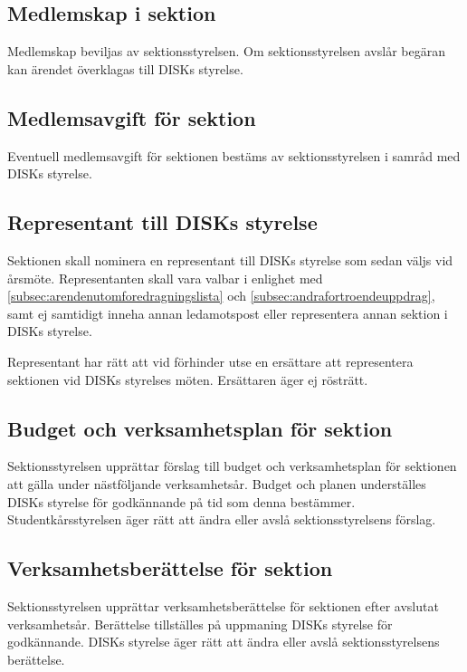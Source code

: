         \subsection{Medlemskap i sektion}
        \label{subsec:medlemskapisektion}
                Medlemskap beviljas av sektionsstyrelsen. Om sektionsstyrelsen avslår begäran kan ärendet överklagas till DISKs styrelse.

        \subsection{Medlemsavgift för sektion}
        \label{subsec:medlemsavgiftforsektion}
                Eventuell medlemsavgift för sektionen bestäms av sektionsstyrelsen i samråd med DISKs styrelse.

        \subsection{Representant till DISKs styrelse}
        \label {subsec:representanttilldisksstyrelse}
                Sektionen skall nominera en representant till DISKs styrelse som sedan väljs vid årsmöte. Representanten skall vara valbar i enlighet med \ref{subsec:arendenutomforedragningslista} och \ref{subsec:andrafortroendeuppdrag}, samt ej samtidigt inneha annan ledamotspost eller representera annan sektion i DISKs styrelse.\par
                Representant har rätt att vid förhinder utse en ersättare att representera sektionen vid DISKs styrelses möten. Ersättaren äger ej rösträtt.

        \subsection{Budget och verksamhetsplan för sektion}
        \label{subsec:budgetochverksamhetsplanforsektion}
                Sektionsstyrelsen upprättar förslag till budget och verksamhetsplan för sektionen att gälla under nästföljande verksamhetsår. Budget och planen underställes DISKs styrelse för godkännande på tid som denna bestämmer. Studentkårsstyrelsen äger rätt att ändra eller avslå sektionsstyrelsens förslag.

        \subsection{Verksamhetsberättelse för sektion}
        \label{subsec:verksamhetsberattelseforsektion}
                Sektionsstyrelsen upprättar verksamhetsberättelse för sektionen efter avslutat verksamhetsår. Berättelse tillställes på uppmaning DISKs styrelse för godkännande. DISKs styrelse äger rätt att ändra eller avslå sektionsstyrelsens berättelse.
